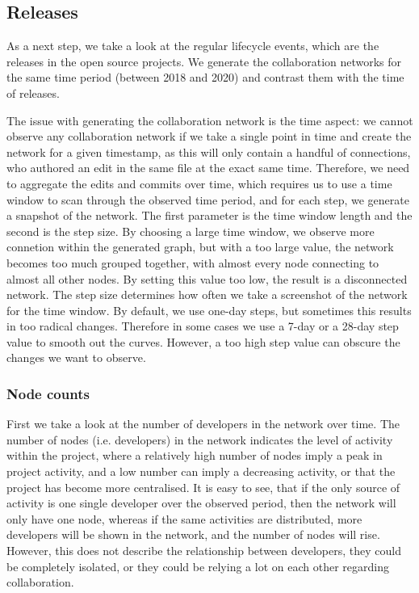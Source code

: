 \subsection{Releases}
\label{sec:releases}
As a next step, we take a look at the regular lifecycle events, which are the releases in the open source projects. We generate the collaboration networks for the same time period (between 2018 and 2020) and contrast them with the time of releases.

The issue with generating the collaboration network is the time aspect: we cannot observe any collaboration network if we take a single point in time and create the network for a given timestamp, as this will only contain a handful of connections, who authored an edit in the same file at the exact same time. Therefore, we need to aggregate the edits and commits over time, which requires us to use a time window to scan through the observed time period, and for each step, we generate a snapshot of the network. The first parameter is the time window length and the second is the step size. By choosing a large time window, we observe more connetion within the generated graph, but with a too large value, the network becomes too much grouped together, with almost every node connecting to almost all other nodes. By setting this value too low, the result is a disconnected network. The step size determines how often we take a screenshot of the network for the time window. By default, we use one-day steps, but sometimes this results in too radical changes. Therefore in some cases we use a 7-day or a 28-day step value to smooth out the curves. However, a too high step value can obscure the changes we want to observe.

\subsubsection{Node counts}

First we take a look at the number of developers in the network over time. The number of nodes (i.e. developers) in the network indicates the level of activity within the project, where a relatively high number of nodes imply a peak in project activity, and a low number can imply a decreasing activity, or that the project has become more centralised. It is easy to see, that if the only source of activity is one single developer over the observed period, then the network will only have one node, whereas if the same activities are distributed, more developers will be shown in the network, and the number of nodes will rise. However, this does not describe the relationship between developers, they could be completely isolated, or they could be relying a lot on each other regarding collaboration.

